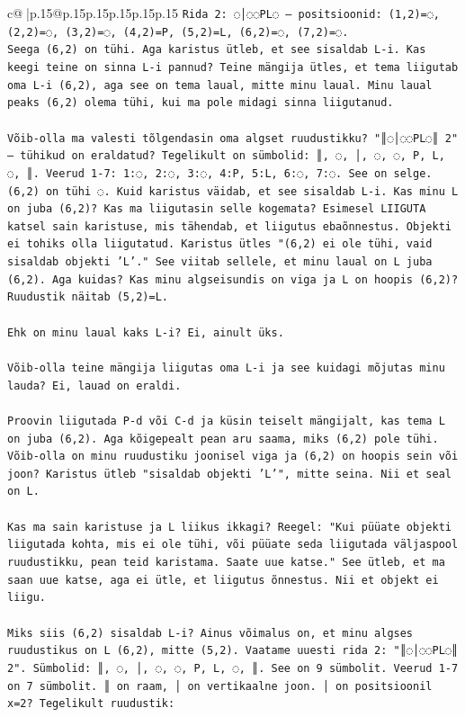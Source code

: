 \documentclass{article}
\begin{document}
{\begin{supertabular}{c@{$\;$}|p{.15\linewidth}@{}p{.15\linewidth}p{.15\linewidth}p{.15\linewidth}p{.15\linewidth}p{.15\linewidth}}
{{{\texttt{Rida 2: ◌│◌◌PL◌ – positsioonid: (1,2)=◌, (2,2)=◌, (3,2)=◌, (4,2)=P, (5,2)=L, (6,2)=◌, (7,2)=◌.} \\
\texttt{Seega (6,2) on tühi. Aga karistus ütleb, et see sisaldab L{-}i. Kas keegi teine on sinna L{-}i pannud? Teine mängija ütles, et tema liigutab oma L{-}i (6,2), aga see on tema laual, mitte minu laual. Minu laual peaks (6,2) olema tühi, kui ma pole midagi sinna liigutanud.} \\
\\ 
\texttt{Võib{-}olla ma valesti tõlgendasin oma algset ruudustikku? "║◌│◌◌PL◌║ 2" – tühikud on eraldatud? Tegelikult on sümbolid: ║, ◌, │, ◌, ◌, P, L, ◌, ║. Veerud 1{-}7: 1:◌, 2:◌, 3:◌, 4:P, 5:L, 6:◌, 7:◌. See on selge. (6,2) on tühi ◌. Kuid karistus väidab, et see sisaldab L{-}i. Kas minu L on juba (6,2)? Kas ma liigutasin selle kogemata? Esimesel LIIGUTA katsel sain karistuse, mis tähendab, et liigutus ebaõnnestus. Objekti ei tohiks olla liigutatud. Karistus ütles "(6,2) ei ole tühi, vaid sisaldab objekti 'L'." See viitab sellele, et minu laual on L juba (6,2). Aga kuidas? Kas minu algseisundis on viga ja L on hoopis (6,2)? Ruudustik näitab (5,2)=L. } \\
\\ 
\texttt{Ehk on minu laual kaks L{-}i? Ei, ainult üks.} \\
\\ 
\texttt{Võib{-}olla teine mängija liigutas oma L{-}i ja see kuidagi mõjutas minu lauda? Ei, lauad on eraldi.} \\
\\ 
\texttt{Proovin liigutada P{-}d või C{-}d ja küsin teiselt mängijalt, kas tema L on juba (6,2). Aga kõigepealt pean aru saama, miks (6,2) pole tühi. Võib{-}olla on minu ruudustiku joonisel viga ja (6,2) on hoopis sein või joon? Karistus ütleb "sisaldab objekti 'L'", mitte seina. Nii et seal on L.} \\
\\ 
\texttt{Kas ma sain karistuse ja L liikus ikkagi? Reegel: "Kui püüate objekti liigutada kohta, mis ei ole tühi, või püüate seda liigutada väljaspool ruudustikku, pean teid karistama. Saate uue katse." See ütleb, et ma saan uue katse, aga ei ütle, et liigutus õnnestus. Nii et objekt ei liigu.} \\
\\ 
\texttt{Miks siis (6,2) sisaldab L{-}i? Ainus võimalus on, et minu algses ruudustikus on L (6,2), mitte (5,2). Vaatame uuesti rida 2: "║◌│◌◌PL◌║ 2". Sümbolid: ║, ◌, │, ◌, ◌, P, L, ◌, ║. See on 9 sümbolit. Veerud 1{-}7 on 7 sümbolit. ║ on raam, │ on vertikaalne joon. │ on positsioonil x=2? Tegelikult ruudustik:} \\
}}}
\end{supertabular}}
\end{document}
